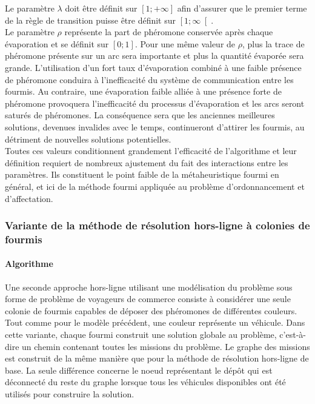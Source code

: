 Le paramètre $\lambda$ doit être définit sur $\left[1;+\infty\right]$ afin d'assurer que le premier terme de la règle de transition puisse être définit sur $\left[1;\infty\right[$.\\

Le paramètre $\rho$ représente la part de phéromone conservée après chaque évaporation et se définit sur $\left[0;1\right]$. Pour une même valeur de $\rho$, plus la trace de phéromone présente sur un arc sera importante et plus la quantité évaporée sera grande. L'utilisation d'un fort taux d'évaporation combiné à une faible présence de phéromone conduira à l'inefficacité du système de communication entre les fourmis. Au contraire, une évaporation faible alliée à une présence forte de phéromone provoquera l'inefficacité du processus d'évaporation et les arcs seront saturés de phéromones. La conséquence sera que les anciennes meilleures solutions, devenues invalides avec le temps, continueront d'attirer les fourmis, au détriment de nouvelles solutions potentielles.\\

Toutes ces valeurs conditionnent grandement l'efficacité de l'algorithme et leur définition requiert de nombreux ajustement du fait des interactions entre les paramètres. Ils constituent le point faible de la métaheuristique fourmi en général, et ici de la méthode fourmi appliquée au problème d'ordonnancement et d'affectation.

\subsubsection{Variante de la méthode de résolution hors-ligne à colonies de fourmis}\label{chap:ordo:reso:offlineACO2}

\paragraph{Algorithme}
Une seconde approche hors-ligne utilisant une modélisation du problème sous forme de problème de voyageurs de commerce consiste à considérer une seule colonie de fourmis capables de déposer des phéromones de différentes couleurs. Tout comme pour le modèle précédent, une couleur représente un véhicule. Dans cette variante, chaque fourmi construit une solution globale au problème, c'est-à-dire un chemin contenant toutes les missions du problème. Le graphe des missions est construit de la même manière que pour la méthode de résolution hors-ligne de base. La seule différence concerne le noeud représentant le dépôt qui est déconnecté du reste du graphe lorsque tous les véhicules disponibles ont été utilisés pour construire la solution.

